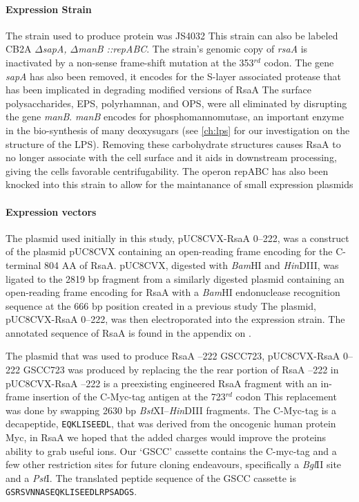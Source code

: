 \paragraph{Expression Strain} The strain used to produce protein was JS4032 
This strain can also be labeled \caulobacter{} CB2A \textit{$\Delta$sapA, $\Delta$manB ::repABC}. The strain's genomic copy of \textit{rsaA} is inactivated by a non-sense frame-shift mutation at the 353$^{rd}$ codon. The gene \textit{sapA} has also been removed, it encodes for the S-layer associated protease that has been implicated in degrading modified versions of RsaA The surface polysaccharides, \ac{EPS}, polyrhamnan, and \ac{OPS}, were all eliminated by disrupting the gene \textit{manB}. \textit{manB} encodes for phosphomannomutase, an important enzyme in the bio-synthesis of many deoxysugars (see \cref{ch:lps} for our investigation on the structure of the \ac{LPS}). Removing these carbohydrate structures causes RsaA to no longer associate with the cell surface and it aids in downstream processing, giving the cells favorable centrifugability. The operon repABC has also been knocked into this strain to allow for the maintanance of small expression plasmids

\paragraph{Expression vectors} The plasmid used initially in this study, pUC8CVX-RsaA \del{}0--222, was a construct of the plasmid pUC8CVX containing an open-reading frame encoding for the C-terminal 804 AA of RsaA. pUC8CVX, digested with \textit{Bam}HI and \textit{Hin}DIII, was ligated to the 2819 bp fragment from a similarly digested plasmid containing an open-reading frame encoding for RsaA with a \textit{Bam}HI  endonuclease recognition sequence at the 666 bp position created in a previous study The plasmid, pUC8CVX-RsaA \del{} 0--222, was then electroporated into the expression strain. The annotated sequence of RsaA is found in the appendix on .

The plasmid that was used to produce RsaA --222 GSCC723, pUC8CVX-RsaA \del{}0--222 GSCC723 was produced by replacing the the rear portion of RsaA --222 in pUC8CVX-RsaA --222 is a preexisting engineered RsaA fragment with an in-frame insertion of the C-Myc-tag antigen at the 723$^{rd}$ codon This replacement was done by swapping 2630 bp \textit{Bst}XI--\textit{Hin}DIII fragments. The C-Myc-tag is a decapeptide, \texttt{EQKLISEEDL}, that was derived from the oncogenic human protein Myc, in RsaA we hoped that the added charges would improve the proteins ability to grab useful ions. Our `GSCC' cassette contains the C-myc-tag and a few other restriction sites for future cloning endeavours, specifically a \textit{Bgl}II site and a \textit{Pst}I. The translated peptide sequence of the GSCC cassette is \texttt{GSRSVNNASEQKLISEEDLRPSADGS}. 

